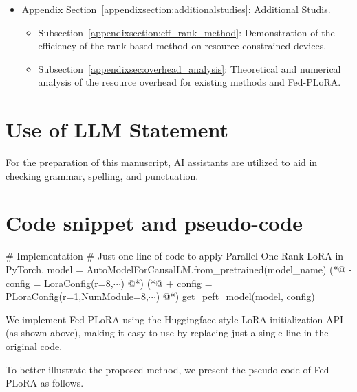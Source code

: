 \documentclass{article} %
\newcommand{\markDel}[1]{%
  \textcolor{diffRedText}{\colorbox{diffRedBg}{#1}}%
}
\newcommand{\markAdd}[1]{%
  \textcolor{diffGreenText}{\colorbox{diffGreenBg}{#1}}%
}
\begin{document}
\begin{itemize}
    \item Appendix Section~\ref{appendixsection:additionalstudies}: Additional Studis.
        \begin{itemize}
    
            \item Subsection~\ref{appendixsection:eff_rank_method}: Demonstration of the efficiency of the rank-based method on resource-constrained devices.
            
            \item Subsection~\ref{appendixsec:overhead_analysis}: Theoretical and numerical analysis of the resource overhead for existing methods and Fed-PLoRA.
        \end{itemize}
    
\end{itemize}


\section*{Use of LLM Statement}
For the preparation of this manuscript, AI assistants are utilized to aid in checking grammar, spelling, and punctuation.

\section{Code snippet and pseudo-code}\label{appendixsection:codesnippet}

\begin{codeblock} 
# Implementation
# Just one line of code to apply Parallel One-Rank LoRA in PyTorch.
model = AutoModelForCausalLM.from_pretrained(model_name)
(*@\markDel{- config = LoraConfig(r=8,$\cdots$)}@*)
(*@\markAdd{+ config = PLoraConfig(r=1,NumModule=8,$\cdots$)}@*)
get_peft_model(model, config)
\end{codeblock}

We implement Fed-PLoRA using the Huggingface-style LoRA initialization API (as shown above), making it easy to use by replacing just a single line in the original code.

{To better illustrate the proposed method, we present the pseudo-code of Fed-PLoRA as follows.}
\end{document}
